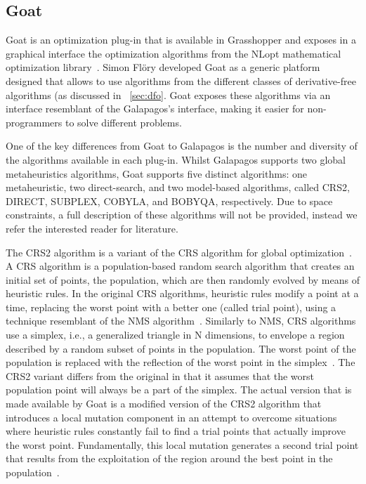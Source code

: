 \subsection{Goat}

	Goat is an optimization plug-in that is available in Grasshopper and exposes in a graphical interface the optimization algorithms from the NLopt mathematical optimization library~\cite{NLOPT}. Simon Flöry developed Goat as a generic platform designed that allows to use algorithms from the different classes of derivative-free algorithms (as discussed in ~\cref{sec:dfo}. Goat exposes these algorithms via an interface resemblant of the Galapagos's interface, making it easier for non-programmers to solve different problems. 

	One of the key differences from Goat to Galapagos is the number and diversity of the algorithms available in each plug-in. Whilst Galapagos supports two global metaheuristics algorithms, Goat supports five distinct algorithms: one metaheuristic, two direct-search, and two model-based algorithms, called CRS2, DIRECT, SUBPLEX, COBYLA, and BOBYQA, respectively. Due to space constraints, a full description of these algorithms will not be provided, instead we refer the interested reader for literature.  
	
	The CRS2 algorithm is a variant of the \ac{CRS} algorithm for global optimization~\cite{Price1983}. A \ac{CRS} algorithm is a population-based random search algorithm that creates an initial set of points, the population, which are then randomly evolved by means of heuristic rules. In the original \ac{CRS} algorithms, heuristic rules modify a point at a time, replacing the worst point with a better one (called trial point), using a technique resemblant of the \ac{NMS} algorithm~\cite{Nelder1964}. Similarly to \ac{NMS}, \ac{CRS} algorithms use a simplex, i.e., a generalized triangle in N dimensions, to envelope a region described by a random subset of points in the population. The worst point of the population is replaced with the reflection of the worst point in the simplex~\cite{Kaelo2006CRS2}. The CRS2 variant differs from the original in that it assumes that the worst population point will always be a part of the simplex. The actual version that is made available by Goat is a modified version of the CRS2 algorithm that introduces a local mutation component in an attempt to overcome situations where heuristic rules constantly fail to find a trial points that actually improve the worst point. Fundamentally, this local mutation generates a second trial point that results from the exploitation of the region around the best point in the population~\cite{Kaelo2006CRS2}.  
	
